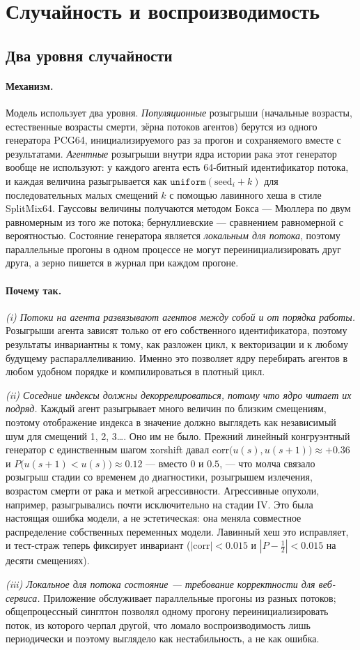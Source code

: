 \documentclass[12pt,a4paper]{article}
\newcommand{\id}[1]{\texttt{#1}}
\newcommand{\mech}[1]{\paragraph{Механизм.} #1}
\newcommand{\why}[1]{\paragraph{Почему так.} #1}
\begin{document}
\section{Случайность и воспроизводимость}

\subsection{Два уровня случайности}

\mech{Модель использует два уровня. \emph{Популяционные} розыгрыши (начальные возрасты, естественные
возрасты смерти, зёрна потоков агентов) берутся из одного генератора PCG64, инициализируемого раз за прогон и
сохраняемого вместе с результатами. \emph{Агентные} розыгрыши внутри ядра истории рака этот генератор вообще
не используют: у каждого агента есть 64-битный идентификатор потока, и каждая величина разыгрывается как
$\id{uniform}(\text{seed}_i + k)$ для последовательных малых смещений $k$ с помощью лавинного хеша в стиле
SplitMix64. Гауссовы величины получаются методом Бокса --- Мюллера по двум равномерным из того же потока;
бернуллиевские --- сравнением равномерной с вероятностью. Состояние генератора является \emph{локальным для
потока}, поэтому параллельные прогоны в одном процессе не могут переинициализировать друг друга, а зерно
пишется в журнал при каждом прогоне.}

\why{\emph{(i) Потоки на агента развязывают агентов между собой и от порядка работы.} Розыгрыши агента
зависят только от его собственного идентификатора, поэтому результаты инвариантны к тому, как разложен цикл,
к векторизации и к любому будущему распараллеливанию. Именно это позволяет ядру перебирать агентов в любом
удобном порядке и компилироваться в плотный цикл.

\emph{(ii) Соседние индексы должны декоррелироваться, потому что ядро читает их подряд.} Каждый агент
разыгрывает много величин по близким смещениям, поэтому отображение индекса в значение должно выглядеть как
независимый шум для смещений 1, 2, 3\ldots. Оно им не было. Прежний линейный конгруэнтный генератор с
единственным шагом xorshift давал $\mathrm{corr}\bigl(u(s),u(s{+}1)\bigr)\approx+0.36$ и
$P\bigl(u(s{+}1)<u(s)\bigr)\approx0.12$ --- вместо $0$ и $0.5$, --- что молча связало розыгрыш стадии со
временем до диагностики, розыгрышем излечения, возрастом смерти от рака и меткой агрессивности. Агрессивные
опухоли, например, разыгрывались почти исключительно на стадии IV. Это была настоящая ошибка модели, а не
эстетическая: она меняла совместное распределение собственных переменных модели. Лавинный хеш это
исправляет, и тест-страж теперь фиксирует инвариант ($|\mathrm{corr}|<0.015$ и $|P-\tfrac12|<0.015$ на
десяти смещениях).

\emph{(iii) Локальное для потока состояние --- требование корректности для веб-сервиса.} Приложение
обслуживает параллельные прогоны из разных потоков; общепроцессный синглтон позволял одному прогону
переинициализировать поток, из которого черпал другой, что ломало воспроизводимость лишь периодически и
поэтому выглядело как нестабильность, а не как ошибка.}
\end{document}
